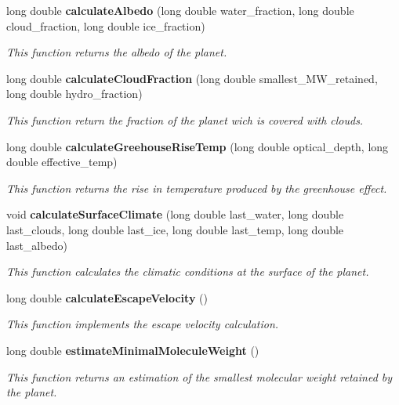 \begin{CompactItemize}
long double {\bf calculate\-Albedo} (long double water\_\-fraction, long double cloud\_\-fraction, long double ice\_\-fraction)
\begin{CompactList}\small\item\em This function returns the albedo of the planet. \item\end{CompactList}\item 
long double {\bf calculate\-Cloud\-Fraction} (long double smallest\_\-MW\_\-retained, long double hydro\_\-fraction)
\begin{CompactList}\small\item\em This function return the fraction of the planet wich is covered with clouds. \item\end{CompactList}\item 
long double {\bf calculate\-Greehouse\-Rise\-Temp} (long double optical\_\-depth, long double effective\_\-temp)
\begin{CompactList}\small\item\em This function returns the rise in temperature produced by the greenhouse effect. \item\end{CompactList}\item 
void {\bf calculate\-Surface\-Climate} (long double last\_\-water, long double last\_\-clouds, long double last\_\-ice, long double last\_\-temp, long double last\_\-albedo)
\begin{CompactList}\small\item\em This function calculates the climatic conditions at the surface of the planet. \item\end{CompactList}\item 
long double {\bf calculate\-Escape\-Velocity} ()
\begin{CompactList}\small\item\em This function implements the escape velocity calculation. \item\end{CompactList}\item 
long double {\bf estimate\-Minimal\-Molecule\-Weight} ()
\begin{CompactList}\small\item\em This function returns an estimation of the smallest molecular weight retained by the planet. \item\end{CompactList}\item 

\end{CompactItemize}
